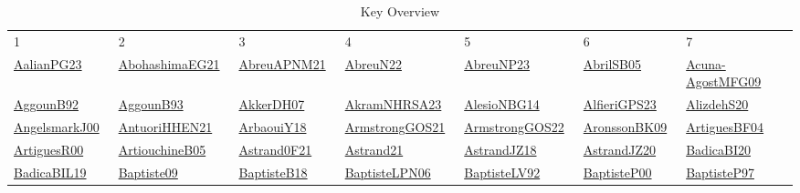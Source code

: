 {\scriptsize
\begin{longtable}{*{7}{l}}
\rowcolor{white}\caption{Key Overview}\\ \toprule
\rowcolor{white}1 & 2 & 3 & 4 & 5 & 6 & 7\\ \midrule
\endhead
\bottomrule
\endfoot
\href{papers/AalianPG23.pdf}{AalianPG23}~\cite{AalianPG23} & \href{articles/AbohashimaEG21.pdf}{AbohashimaEG21}~\cite{AbohashimaEG21} & \href{}{AbreuAPNM21}~\cite{AbreuAPNM21} & \href{articles/AbreuN22.pdf}{AbreuN22}~\cite{AbreuN22} & \href{}{AbreuNP23}~\cite{AbreuNP23} & \href{papers/AbrilSB05.pdf}{AbrilSB05}~\cite{AbrilSB05} & \href{papers/Acuna-AgostMFG09.pdf}{Acuna-AgostMFG09}~\cite{Acuna-AgostMFG09}\\ 
\href{}{AggounB92}~\cite{AggounB92} & \href{articles/AggounB93.pdf}{AggounB93}~\cite{AggounB93} & \href{papers/AkkerDH07.pdf}{AkkerDH07}~\cite{AkkerDH07} & \href{articles/AkramNHRSA23.pdf}{AkramNHRSA23}~\cite{AkramNHRSA23} & \href{papers/AlesioNBG14.pdf}{AlesioNBG14}~\cite{AlesioNBG14} & \href{articles/AlfieriGPS23.pdf}{AlfieriGPS23}~\cite{AlfieriGPS23} & \href{}{AlizdehS20}~\cite{AlizdehS20}\\ 
\href{papers/AngelsmarkJ00.pdf}{AngelsmarkJ00}~\cite{AngelsmarkJ00} & \href{papers/AntuoriHHEN21.pdf}{AntuoriHHEN21}~\cite{AntuoriHHEN21} & \href{papers/ArbaouiY18.pdf}{ArbaouiY18}~\cite{ArbaouiY18} & \href{papers/ArmstrongGOS21.pdf}{ArmstrongGOS21}~\cite{ArmstrongGOS21} & \href{papers/ArmstrongGOS22.pdf}{ArmstrongGOS22}~\cite{ArmstrongGOS22} & \href{papers/AronssonBK09.pdf}{AronssonBK09}~\cite{AronssonBK09} & \href{papers/ArtiguesBF04.pdf}{ArtiguesBF04}~\cite{ArtiguesBF04}\\ 
\href{articles/ArtiguesR00.pdf}{ArtiguesR00}~\cite{ArtiguesR00} & \href{papers/ArtiouchineB05.pdf}{ArtiouchineB05}~\cite{ArtiouchineB05} & \href{papers/Astrand0F21.pdf}{Astrand0F21}~\cite{Astrand0F21} & \href{}{Astrand21}~\cite{Astrand21} & \href{papers/AstrandJZ18.pdf}{AstrandJZ18}~\cite{AstrandJZ18} & \href{articles/AstrandJZ20.pdf}{AstrandJZ20}~\cite{AstrandJZ20} & \href{}{BadicaBI20}~\cite{BadicaBI20}\\ 
\href{papers/BadicaBIL19.pdf}{BadicaBIL19}~\cite{BadicaBIL19} & \href{papers/Baptiste09.pdf}{Baptiste09}~\cite{Baptiste09} & \href{articles/BaptisteB18.pdf}{BaptisteB18}~\cite{BaptisteB18} & \href{}{BaptisteLPN06}~\cite{BaptisteLPN06} & \href{papers/BaptisteLV92.pdf}{BaptisteLV92}~\cite{BaptisteLV92} & \href{articles/BaptisteP00.pdf}{BaptisteP00}~\cite{BaptisteP00} & \href{papers/BaptisteP97.pdf}{BaptisteP97}~\cite{BaptisteP97}\\ 

\end{longtable}}

